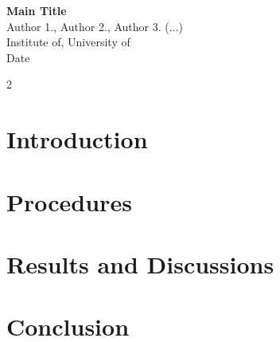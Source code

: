 \documentclass[a4paper, 13pt]{article}
\begin{document}
\begin{center}
    {\Large \textbf{Main Title}}\\[0.3cm]
    Author 1., Author 2., Author 3. (...)\\[0.1cm]
    Institute of, University of\\[0.3cm]
    Date
\end{center}
\begin{abstract}
\textit{Abstract goes here.}
\end{abstract}
\vspace{0.1cm} 

\setlength{\columnsep}{0.6cm}
\raggedcolumns
\begin{multicols*}{2}
\section{Introduction}


\section{Procedures}


\section{Results and Discussions}


\section{Conclusion}




\end{multicols*}
\end{document}
